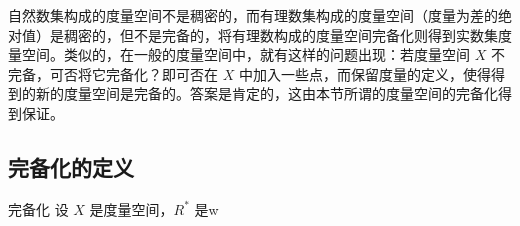 
自然数集构成的度量空间不是稠密的，而有理数集构成的度量空间（度量为差的绝对值）是稠密的，但不是完备的，将有理数构成的度量空间完备化则得到实数集度量空间。类似的，在一般的度量空间中，就有这样的问题出现：若度量空间 $X$ 不完备，可否将它完备化？即可否在 $X$ 中加入一些点，而保留度量的定义，使得得到的新的度量空间是完备的。答案是肯定的，这由本节所谓的度量空间的完备化得到保证。

\subsection{完备化的定义}
\begin{definition}{完备化}
设 $X$ 是度量空间，$R^*$ 是w
\end{definition}

